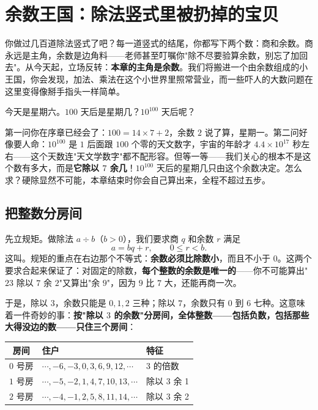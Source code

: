 \chapter{余数王国：除法竖式里被扔掉的宝贝}

你做过几百道除法竖式了吧？每一道竖式的结尾，你都写下两个数：商和余数。商永远是主角，余数是边角料——老师甚至叮嘱你"除不尽要验算余数，别忘了加回去"。从今天起，立场反转：\textbf{本章的主角是余数}。我们将搬进一个由余数组成的小王国，你会发现，加法、乘法在这个小世界里照常营业，而一些吓人的大数问题在这里变得像掰手指头一样简单。

\begin{kaiwei}
今天是星期六。$100$ 天后是星期几？$10^{100}$ 天后呢？
\end{kaiwei}

第一问你在序章已经会了：$100 = 14\times 7 + 2$，余数 $2$ 说了算，星期一。第二问好像要人命：$10^{100}$ 是 $1$ 后面跟 $100$ 个零的天文数字，宇宙的年龄才 $4.4 \times 10^{17}$ 秒左右——这个天数连"天文学数字"都不配形容。但等一等——我们关心的根本不是这个数有多大，而是\textbf{它除以 $7$ 余几}！$10^{100}$ 天后的星期几只由这个余数决定。怎么求？硬除显然不可能，本章结束时你会自己算出来，全程不超过五步。

\section{把整数分房间}

先立规矩。做除法 $a \div b$（$b > 0$），我们要求商 $q$ 和余数 $r$ 满足
\[
a = bq + r, \qquad 0 \le r < b .
\]
这叫。规矩的重点在右边那个不等式：\textbf{余数必须比除数小}，而且不小于 $0$。这两个要求合起来保证了：对固定的除数，\textbf{每个整数的余数是唯一的}——你不可能算出"$23$ 除以 $7$ 余 $2$"又算出"余 $9$"，因为 $9$ 比 $7$ 大，还能再商一次。

于是，除以 $3$，余数只能是 $0, 1, 2$ 三种；除以 $7$，余数只有 $0$ 到 $6$ 七种。这意味着一件奇妙的事：\textbf{按"除以 $3$ 的余数"分房间，全体整数——包括负数，包括那些大得没边的数——只住三个房间}：

\begin{center}
\begin{tabular}{cll}
\toprule
房间 & 住户 & 特征 \\
\midrule
$0$ 号房 & $\cdots, -6, -3, 0, 3, 6, 9, 12, \cdots$ & 3 的倍数 \\
$1$ 号房 & $\cdots, -5, -2, 1, 4, 7, 10, 13, \cdots$ & 除以 3 余 1 \\
$2$ 号房 & $\cdots, -4, -1, 2, 5, 8, 11, 14, \cdots$ & 除以 3 余 2 \\
\bottomrule
\end{tabular}
\end{center}

